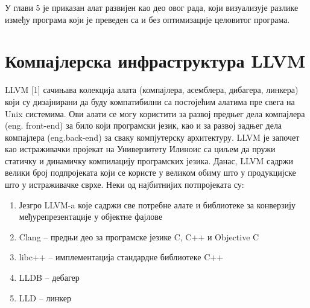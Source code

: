 \documentclass[12pt,oneside]{memoir}
\begin{document}
У глави 5 је приказан алат развијен као део овог рада, који визуализује разлике 
између програма који је преведен са и без оптимизације целовитог програма.

\chapter{Компајлерска инфраструктура LLVM}
\label{chp:LLVM}

LLVM [1]  сачињава колекција алата (компајлера, асемблера, дибагера, линкера)
који су дизајнирани да буду компатибилни са постојећим алатима пре свега на 
Unix системима.
Ови алати  се могу користити за развој предњег дела компајлера (eng. front-end)
 за било који програмски језик, 
као и за развој задњег дела компајлера (eng.back-end) за сваку компјутерску архитектуру.
LLVM је започет као истраживачки пројекат на Универзитету Илиноис са циљем да 
пружи статичку и динамичку компилацију програмских језика. 
Данас, LLVM садржи велики број подпројеката који се користе у великом обиму 
што у продукцијске што у истраживачке сврхе.
\newline Неки од најбитнијих потпројеката су:
\begin{enumerate}
\item Језгро LLVM-a које садржи све потребне алате и библиотеке за конверзију
међурепрезентације у објектне фајлове 
\item Clang -- предњи део за програмске језике C, C++ и Objective C
\item libc++ -- имплементација стандардне библиотеке C++
\item LLDB -- дебагер
\item LLD -- линкер
\end{enumerate}
\end{document}
